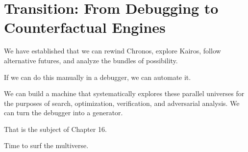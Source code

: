 \section{Transition: From Debugging to Counterfactual Engines}

We have established that we can rewind Chronos, explore Kairos, follow alternative futures, and analyze the bundles of possibility.

If we can do this manually in a debugger, we can automate it.

We can build a machine that systematically explores these parallel universes for the purposes of search, optimization, verification, and adversarial analysis. We can turn the debugger into a generator.

That is the subject of Chapter 16.

Time to surf the multiverse.
